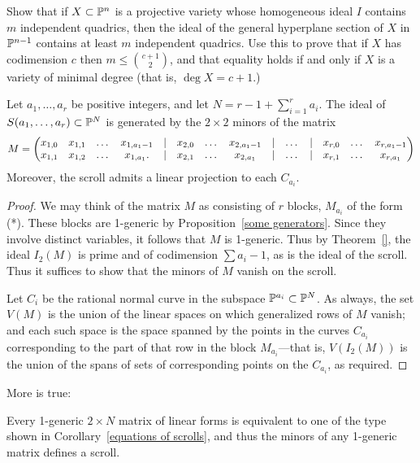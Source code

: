 \begin{exercise}
Show that if $X\subset {\mathbb P}^n$ is a projective variety whose homogeneous ideal $I$ contains $m$ independent quadrics, then the ideal of the general hyperplane section of $X$ in ${\mathbb P}^{n-1}$
contains at least $m$ independent quadrics. Use this to prove that if $X$ has codimension $c$ then $m\leq {c+1\choose 2}$, and that equality holds if and only if
$X$ is a variety of minimal degree (that is, $\deg X = c+1$.)
\end{exercise}

\begin{corollary}\label{equations of scrolls} Let $a_{1}, \dots, a_{r}$ be positive integers, and let $N = r-1+\sum_{i=1}^{r} a_{i}$.
The ideal of $S(a_{1},\dots,a_{r})\subset {\mathbb P}^{N}$ is generated by the $2\times 2$ minors of the matrix
{\footnotesize
$$
\setcounter{MaxMatrixCols}{20}
M = \begin{pmatrix}
x_{1,0}&x_{1,1}&\dots&x_{1, a_{1}-1}&|&x_{2,0}&\dots&x_{2, a_{1}-1}&|&\dots&|&x_{r,0}&\dots&x_{r, a_{1}-1}\\
x_{1,1}&x_{1,2}&\dots&x_{1, a_{1}}.  &|&x_{2,1}&\dots&x_{2, a_{1}}&|&\dots&|&x_{r,1}&\dots&x_{r, a_{1}}
\end{pmatrix}
$$
}
Moreover, the scroll admits a linear projection to each $C_{a_i}$.
\end{corollary}

\begin{proof} We may think of the matrix $M$ as consisting of $r$ blocks, $M_{a_{i}}$ of the form (*). These blocks are 1-generic by Proposition~\ref{some generators}. Since they involve distinct variables, it follows that $M$ is 1-generic. Thus by
Theorem~\ref{}, the ideal $I_{2}(M)$ is prime and of codimension $\sum a_{i}-1$, as is the ideal of the scroll. Thus it suffices to show that the minors of $M$ vanish on the scroll.

Let $C_{i}$ be the rational normal curve in the subspace ${\mathbb P}^{a_{i}}\subset{\mathbb P}^{N}$.
As always, the set $V(M)$ is the union of the linear spaces on which generalized rows of $M$ vanish; and each such space is the space spanned by the points in the curves $C_{a_{i}}$ corresponding to the part of that row in the block $M_{a_{i}}$---that is, $V(I_{2}(M))$ is the union of the spans of sets of corresponding points on the $C_{a_{i}}$, as required.
\end{proof}

More is true: 
\begin{fact}
 Every
 1-generic $2 \times N$ matrix of linear forms is equivalent to one of the type shown in
Corollary~\ref{equations of scrolls}, and thus the minors of any 1-generic matrix defines a scroll. 
\end{fact}

